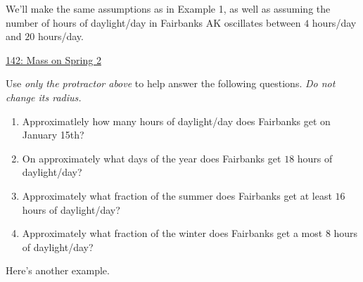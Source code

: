 \documentclass{ximera}
\begin{document}
\begin{example} \label{Ex:PDFIRgv4rr}
We'll make the same assumptions as in Example 1, as well as assuming the number of hours of daylight/day in Fairbanks AK oscillates between $4$ hours/day and $20$ hours/day.

\begin{onlineOnly}
    \begin{center}
\end{center}
\end{onlineOnly}

\href{https://www.desmos.com/calculator/rqdenajviu}{142: Mass on Spring 2}

Use \emph{only the protractor above} to help answer the following questions. \emph{Do not change its radius.}

\begin{enumerate}
\item Approximatlely how many hours of daylight/day does Fairbanks get on January 15th?

\item On approximately what days of the year does Fairbanks get $18$ hours of daylight/day? 

\item Approximately what fraction of the summer does Fairbanks get at least $16$ hours of daylight/day?

\item Approximately what fraction of the winter does Fairbanks get a most $8$ hours of daylight/day?

\end{enumerate}

\end{example}


Here's another example.
\end{document}
